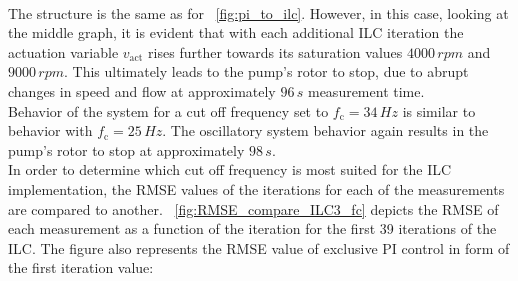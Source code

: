 \\The structure is the same as for \figurename~\ref{fig:pi_to_ilc}. However, in this case, looking at the middle graph, it is evident that with each additional ILC iteration the actuation variable $v_{\mathrm{act}}$ rises further towards its saturation values $4000\,rpm$ and $9000\,rpm$. This ultimately leads to the pump's rotor to stop, due to abrupt changes in speed and flow at approximately $96\,s$ measurement time.
\\Behavior of the system for a cut off frequency set to $f_{\mathrm{c}}=34\,Hz$ is similar to behavior with $f_{\mathrm{c}}=25\,Hz$. The oscillatory system behavior again results in the pump's rotor to stop at approximately $98\,s$.
\\In order to determine which cut off frequency is most suited for the ILC implementation, the RMSE values of the iterations for each of the measurements are compared to another. \figurename~\ref{fig:RMSE_compare_ILC3_fc} depicts the RMSE of each measurement as a function of the iteration for the first 39 iterations of the ILC. The figure also represents the RMSE value of exclusive PI control in form of the first iteration value:
